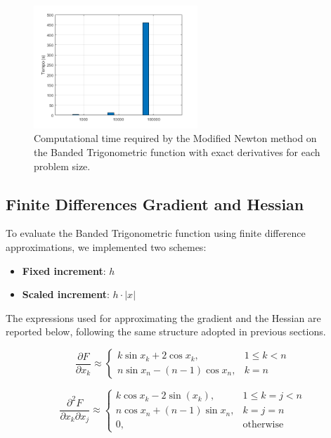 \documentclass[a4paper,12pt]{article}
\begin{document}
	\begin{figure}[htbp]
		\centering
		\includegraphics[width=0.55\textwidth]{../immagini/banded_time.png}
		\caption{Computational time required by the Modified Newton method on the Banded Trigonometric function with exact derivatives for each problem size.}
		\label{fig:bt_time_exact}
	\end{figure}
	
	
	\subsection{Finite Differences Gradient and Hessian}
	
	To evaluate the Banded Trigonometric function using finite difference approximations, we implemented two schemes:
	\begin{itemize}
		\item \textbf{Fixed increment}: $h$
		\item \textbf{Scaled increment}: $h \cdot |x|$
	\end{itemize}
	
	The expressions used for approximating the gradient and the Hessian are reported below, following the same structure adopted in previous sections.
	
	\begin{equation}
		\frac{\partial F}{\partial x_k} \approx
		\begin{cases}
			k \sin x_k + 2 \cos x_k, & 1 \leq k < n \\
			n \sin x_n - (n - 1) \cos x_n, & k = n
		\end{cases}
	\end{equation}
	
	\begin{equation}
		\frac{\partial^2 F}{\partial x_k \partial x_j} \approx
		\begin{cases}
			k \cos x_k - 2 \sin(x_k), & 1 \leq k = j < n \\
			n \cos x_n + (n - 1) \sin x_n, & k = j = n \\
			0, & \text{otherwise}
		\end{cases}
	\end{equation}
	
\end{document}
